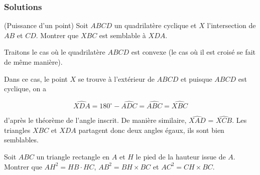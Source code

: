\subsubsection{Solutions}

\setcounter{exo}{0}

\begin{exo}
(Puissance d'un point)
Soit $ABCD$ un quadrilatère cyclique et $X$ l’intersection de $AB$ et $CD$. Montrer que $XBC$ est semblable à $XDA$.
\end{exo}

\begin{sol}
\begin{center}
\end{center}

Traitons le cas où le quadrilatère $ ABCD$ est convexe (le cas où il est croisé se fait de même manière). 

Dans ce cas, le point $X$ se trouve à l'extérieur de $ABCD$ et puisque $ABCD$ est cyclique, on a 

\[\widehat{XDA}=180^\circ-\widehat{ADC}= \widehat{ABC}=\widehat{XBC}\]

d'après le théorème de l'angle inscrit. De manière similaire, $\widehat{XAD}$ = $\widehat{XCB}$. Les triangles $XBC$ et $XDA$ partagent donc deux angles égaux, ils sont bien semblables.
\end{sol}

\begin{exo}
Soit $ABC$ un triangle rectangle en $A$ et $H$ le pied de la hauteur issue de $A$. Montrer que $AH^2 = HB \cdot HC$, $AB^2=BH\times BC$ et $AC^2=CH\times BC$. 
\end{exo}

